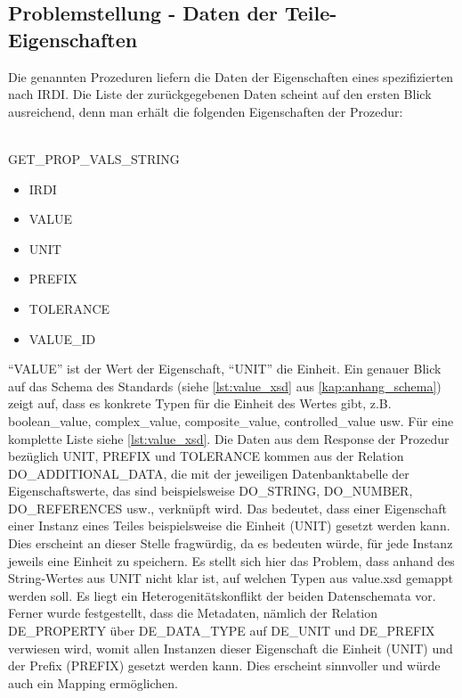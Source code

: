 \subsection{Problemstellung - Daten der Teile-Eigenschaften}\label{sec:problemdateneigenschaften}

Die genannten Prozeduren liefern die Daten der Eigenschaften eines spezifizierten  nach \gls{IRDI}. Die Liste der zurückgegebenen Daten scheint auf den ersten Blick ausreichend, denn man erhält die folgenden Eigenschaften der Prozedur: \\~ 
\linebreak
\linebreak

GET\_PROP\_VALS\_STRING
\begin{multicols}{3}
\begin{itemize}
  \item IRDI
  \item VALUE
  \item UNIT
  \item PREFIX
  \item TOLERANCE
  \item VALUE\_ID
\end{itemize}
\end{multicols}

\enquote{VALUE} ist der Wert der Eigenschaft, \enquote{UNIT} die Einheit. Ein genauer Blick auf das Schema des Standards (siehe \autoref{lst:value_xsd} aus \autoref{kap:anhang_schema}) zeigt auf, dass es konkrete Typen für die Einheit des Wertes gibt, z.B. boolean\_value, complex\_value, composite\_value, controlled\_value usw. Für eine komplette Liste siehe \autoref{lst:value_xsd}. 
Die Daten aus dem Response der Prozedur bezüglich UNIT, PREFIX und TOLERANCE kommen aus der Relation DO\_ADDITIONAL\_DATA, die mit der jeweiligen Datenbanktabelle der Eigenschaftswerte, das sind beispielsweise DO\_STRING, DO\_NUMBER, DO\_REFERENCES usw., verknüpft wird. Das bedeutet, dass einer Eigenschaft einer Instanz eines Teiles beispielsweise die Einheit (UNIT) gesetzt werden kann. Dies erscheint an dieser Stelle fragwürdig, da es bedeuten würde, für jede Instanz jeweils eine Einheit zu speichern. 
Es stellt sich hier das Problem, dass anhand des String-Wertes aus UNIT nicht klar ist, auf welchen Typen aus value.xsd gemappt werden soll. Es liegt ein Heterogenitätskonflikt der beiden Datenschemata vor.  
Ferner wurde festgestellt, dass die Metadaten, nämlich der Relation DE\_PROPERTY über DE\_DATA\_TYPE auf DE\_UNIT und DE\_PREFIX verwiesen wird, womit allen Instanzen dieser Eigenschaft die Einheit (UNIT) und der Prefix (PREFIX) gesetzt werden kann. Dies erscheint sinnvoller und würde auch ein Mapping ermöglichen. 

